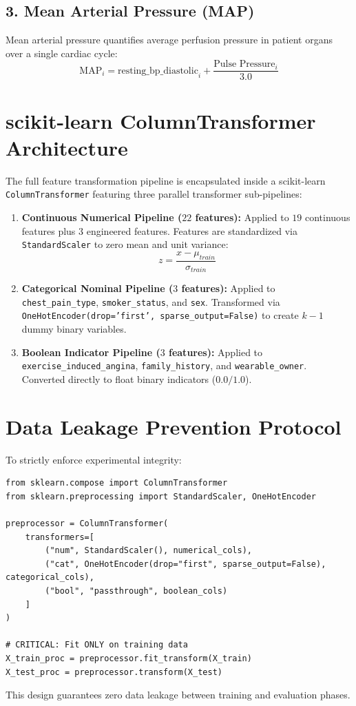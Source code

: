 \subsection{3. Mean Arterial Pressure (MAP)}
Mean arterial pressure quantifies average perfusion pressure in patient organs over a single cardiac cycle:
\begin{equation}
\text{MAP}_i = \text{resting\_bp\_diastolic}_i + \frac{\text{Pulse Pressure}_i}{3.0}
\end{equation}

\section{scikit-learn ColumnTransformer Architecture}
The full feature transformation pipeline is encapsulated inside a scikit-learn \texttt{ColumnTransformer} featuring three parallel transformer sub-pipelines:

\begin{enumerate}
    \item \textbf{Continuous Numerical Pipeline ($22$ features):}  
    Applied to $19$ continuous features plus $3$ engineered features. Features are standardized via \texttt{StandardScaler} to zero mean and unit variance:
    \begin{equation}
    z = \frac{x - \mu_{train}}{\sigma_{train}}
    \end{equation}
    
    \item \textbf{Categorical Nominal Pipeline ($3$ features):}  
    Applied to \texttt{chest\_pain\_type}, \texttt{smoker\_status}, and \texttt{sex}. Transformed via \texttt{OneHotEncoder(drop='first', sparse\_output=False)} to create $k-1$ dummy binary variables.
    
    \item \textbf{Boolean Indicator Pipeline ($3$ features):}  
    Applied to \texttt{exercise\_induced\_angina}, \texttt{family\_history}, and \texttt{wearable\_owner}. Converted directly to float binary indicators ($0.0 / 1.0$).
\end{enumerate}

\section{Data Leakage Prevention Protocol}
To strictly enforce experimental integrity:
\begin{verbatim}
from sklearn.compose import ColumnTransformer
from sklearn.preprocessing import StandardScaler, OneHotEncoder

preprocessor = ColumnTransformer(
    transformers=[
        ("num", StandardScaler(), numerical_cols),
        ("cat", OneHotEncoder(drop="first", sparse_output=False), categorical_cols),
        ("bool", "passthrough", boolean_cols)
    ]
)

# CRITICAL: Fit ONLY on training data
X_train_proc = preprocessor.fit_transform(X_train)
X_test_proc = preprocessor.transform(X_test)
\end{verbatim}
This design guarantees zero data leakage between training and evaluation phases.

